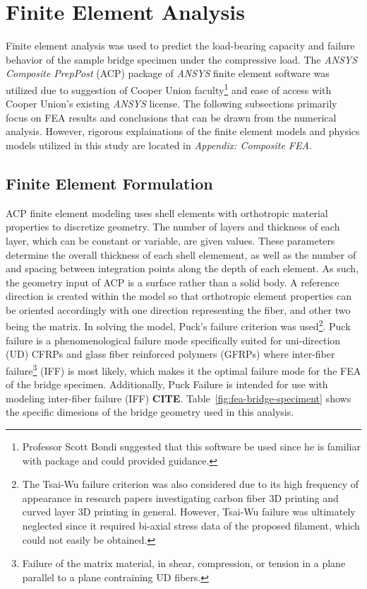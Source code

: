 \section{Finite Element Analysis}

\indent

Finite element analysis was used to predict the load-bearing capacity and failure behavior of the sample bridge specimen under the compressive load. The \textit{ANSYS Composite PrepPost} (ACP) package of \textit{ANSYS} finite element software was utilized due to suggestion of Cooper Union faculty\footnote{Professor Scott Bondi suggested that this software be used since he is familiar with package and could provided guidance.} and ease of access with Cooper Union's existing \textit{ANSYS} license. The following subsections primarily focus on FEA results and conclusions that can be drawn from the numerical analysis. However, rigorous explainations of the finite element models and physics models utilized in this study are located in \textit{Appendix: Composite FEA}.\\

\subsection{Finite Element Formulation}

\indent

ACP finite element modeling uses shell elements with orthotropic material properties to discretize geometry. The number of layers and thickness of each layer, which can be constant or variable, are given values. These parameters determine the overall thickness of each shell elemement, as well as the number of and spacing between integration points along the depth of each element. As such, the geometry input of ACP is a surface rather than a solid body. A reference direction is created within the model so that orthotropic element properties can be oriented accordingly with one direction representing the fiber, and other two being the matrix. In solving the model, Puck's failure criterion was used\footnote{The Tsai-Wu failure criterion was also considered due to its high frequency of appearance in research papers investigating carbon fiber 3D printing and curved layer 3D printing in general. However, Tsai-Wu failure was ultimately neglected since it required bi-axial stress data of the proposed filament, which could not easily be obtained.}. Puck failure is a phenomenological failure mode specifically suited for uni-direction (UD) CFRPs and glass fiber reinforced polymers (GFRPs) where inter-fiber failure\footnote{Failure of the matrix material, in shear, compression, or tension in a plane parallel to a plane contraining UD fibers.} (IFF) is most likely, which makes it the optimal failure mode for the FEA of the bridge specimen. Additionally, Puck Failure is intended for use with modeling inter-fiber failure (IFF) \large{\textbf{CITE}}. Table~\ref{fig:fea-bridge-speciment} shows the specific dimesions of the bridge geometry used in this analysis.\\

